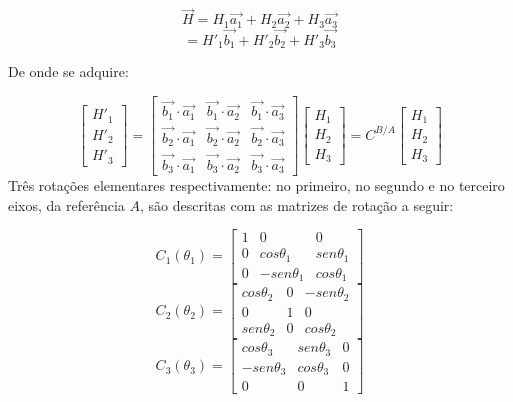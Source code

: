 \begin{equation}
\vec{H}=H_1\vec{a_1}+H_2\vec{a_2}+H_3\vec{a_3}
\end{equation}
\begin{equation}
=H'_1\vec{b_1}+H'_2\vec{b_2}+H'_3\vec{b_3}
\end{equation}

De onde se adquire:

\begin{equation}
\begin{bmatrix}
H'_1 \\ H'_2 \\ H'_3
\end{bmatrix}
=
\begin{bmatrix}
\vec{b_1}\cdot \vec{a_1} & \vec{b_1}\cdot \vec{a_2} & \vec{b_1}\cdot \vec{a_3} \\ \vec{b_2}\cdot \vec{a_1} & \vec{b_2}\cdot \vec{a_2} & \vec{b_2}\cdot \vec{a_3} \\ \vec{b_3}\cdot \vec{a_1} & \vec{b_3}\cdot \vec{a_2} & \vec{b_3}\cdot \vec{a_3}
\end{bmatrix}
\begin{bmatrix}
H_1 \\ H_2 \\ H_3
\end{bmatrix}
=
C^{B/A}
\begin{bmatrix}
H_1 \\ H_2 \\ H_3
\end{bmatrix}
\end{equation}Três rotações elementares respectivamente: no primeiro, no segundo e no terceiro eixos, da referência \begin{math}A\end{math}, são descritas com as matrizes de rotação a seguir:

\begin{equation}C_1(\theta_1)=
\begin{bmatrix}
1 & 0 & 0 \\ 0 & cos\theta_1 & sen\theta_1 \\ 0 & -sen\theta_1 & cos\theta_1 
\end{bmatrix}
\end{equation}
\begin{equation}C_2(\theta_2)=
\begin{bmatrix}
cos\theta_2 & 0 & -sen\theta_2 \\ 0 & 1 & 0 \\ sen\theta_2 & 0 & cos\theta_2
\end{bmatrix}
\end{equation}
\begin{equation}
C_3(\theta_3)=
\begin{bmatrix}
cos\theta_3 & sen\theta_3 & 0 \\ -sen\theta_3 & cos\theta_3 & 0 \\ 0 & 0 & 1
\end{bmatrix}
\end{equation}

